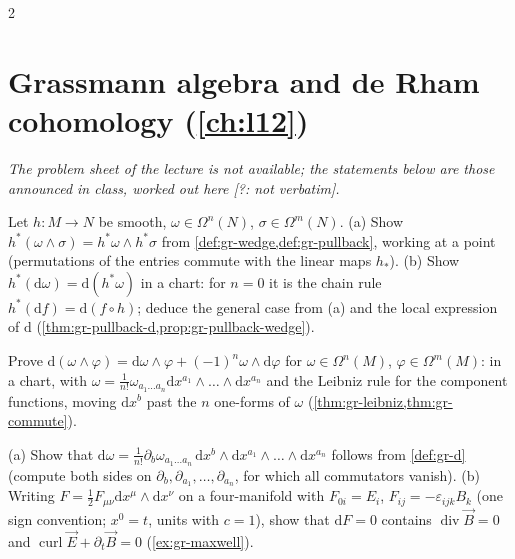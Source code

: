 \begin{paracol}{2}
\section{Grassmann algebra and de Rham cohomology (\cref{ch:l12})}\label{exam:ch12}

\emph{The problem sheet of the lecture is not available; the statements below are those announced in class, worked out here [?: not verbatim].}

\begin{exercise}\label{ex:gr-pullback-full}
Let $h\colon M\to N$ be smooth, $\omega\in\Omega^n(N)$, $\sigma\in\Omega^m(N)$. (a) Show $h^*(\omega\wedge\sigma)=h^*\omega\wedge h^*\sigma$ from \cref{def:gr-wedge,def:gr-pullback}, working at a point (permutations of the entries commute with the linear maps $h_*$). (b) Show $h^*(\mathrm d\omega)=\mathrm d(h^*\omega)$ in a chart: for $n=0$ it is the chain rule
$h^*(\mathrm df)=\mathrm d(f\circ h)$; deduce the general case from (a) and the local expression of $\mathrm d$ (\cref{thm:gr-pullback-d,prop:gr-pullback-wedge}).
\end{exercise}

\begin{exercise}\label{ex:gr-leibniz-full}
Prove $\mathrm d(\omega\wedge\varphi)=\mathrm d\omega\wedge\varphi+(-1)^n\omega\wedge\mathrm d\varphi$ for $\omega\in\Omega^n(M)$, $\varphi\in\Omega^m(M)$: in a chart, with $\omega=\tfrac1{n!}\omega_{a_1\dots a_n}\mathrm dx^{a_1}\wedge\dots\wedge\mathrm dx^{a_n}$ and the Leibniz rule for the component functions, moving $\mathrm dx^b$ past the $n$ one-forms of $\omega$ (\cref{thm:gr-leibniz,thm:gr-commute}).
\end{exercise}

\begin{exercise}\label{ex:gr-maxwell-full}
(a) Show that $\mathrm d\omega=\tfrac1{n!}\partial_b\omega_{a_1\dots a_n}\,\mathrm dx^b\wedge\mathrm dx^{a_1}\wedge\dots\wedge\mathrm dx^{a_n}$ follows from \cref{def:gr-d} (compute both sides on $\partial_{b},\partial_{a_1},\dots,\partial_{a_n}$, for which all commutators vanish). (b) Writing $F=\tfrac12F_{\mu\nu}\mathrm dx^\mu\wedge\mathrm dx^\nu$ on a four-manifold with $F_{0i}=E_i$, $F_{ij}=-\varepsilon_{ijk}B_k$ (one sign convention; $x^0=t$, units with $c=1$), show that $\mathrm dF=0$ contains
$\operatorname{div}\vec B=0$ and $\operatorname{curl}\vec E+\partial_t\vec B=0$ (\cref{ex:gr-maxwell}).
\end{exercise}


\end{paracol}
